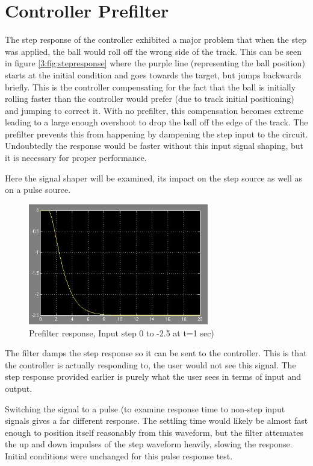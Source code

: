 \section{Controller Prefilter}

The step response of the controller exhibited a major problem that when the step was applied, the ball would roll off the wrong side of the track. This can be seen in figure \ref{3:fig:stepresponse} where the purple line (representing the ball position) starts at the initial condition and goes towards the target, but jumps backwards briefly. This is the controller compensating for the fact that the ball is initially rolling faster than the controller would prefer (due to track initial positioning) and jumping to correct it. With no prefilter, this compensation becomes extreme leading to a large enough overshoot to drop the ball off the edge of the track. The prefilter prevents this from happening by dampening the step input to the circuit. Undoubtedly the response would be faster without this input signal shaping, but it is necessary for proper performance.

Here the signal shaper will be examined, its impact on the step source as well as on a pulse source.

\begin{figure}[h!t]
	\centering
		\includegraphics[width=0.70\textwidth]{pics/lowpassfilter}
	\caption{Prefilter response, Input step 0 to -2.5 at t=1 sec)}
	\label{3:fig:lowpassfilter}
\end{figure}

The filter damps the step response so it can be sent to the controller. This is that the controller is actually responding to, the user would not see this signal. The step response provided earlier is purely what the user sees in terms of input and output.

Switching the signal to a pulse (to examine response time to non-step input signals gives a far different response. The settling time would likely be almost fast enough to position itself reasonably from this waveform, but the filter attenuates the up and down impulses of the step waveform heavily, slowing the response. Initial conditions were unchanged for this pulse response test.

